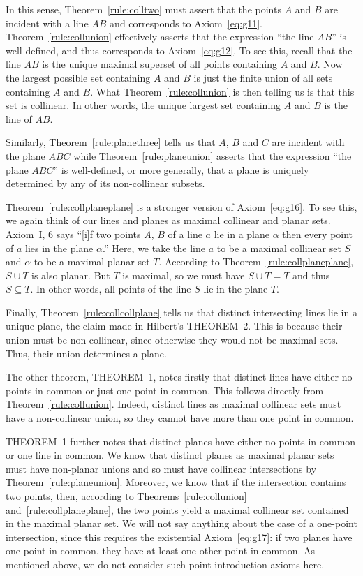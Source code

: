 In this sense, Theorem~\ref{rule:colltwo} must assert that the points $A$ and $B$ are incident with a line $AB$ and corresponds to Axiom~\ref{eq:g11}.  Theorem~\ref{rule:collunion} effectively asserts that the expression ``the line $AB$'' is well-defined, and thus corresponds to Axiom~\ref{eq:g12}. To see this, recall that the line $AB$ is the unique maximal superset of all points containing $A$ and $B$. Now the largest possible set containing $A$ and $B$ is just the finite union of all sets containing $A$ and $B$. What Theorem~\ref{rule:collunion} is then telling us is that this set is collinear. In other words, the unique largest set containing $A$ and $B$ is the line of $AB$.

Similarly, Theorem~\ref{rule:planethree} tells us that $A$, $B$ and $C$ are incident with the plane $ABC$ while Theorem~\ref{rule:planeunion} asserts that the expression ``the plane $ABC$'' is well-defined, or more generally, that a plane is uniquely determined by any of its non-collinear subsets.

Theorem~\ref{rule:collplaneplane} is a stronger version of Axiom~\ref{eq:g16}. To see this, we again think of our lines and planes as maximal collinear and planar sets. Axiom~I, 6 says ``[i]f two points $A$, $B$ of a line $a$ lie in a plane $\alpha$ then every point of $a$ lies in the plane $\alpha$.'' Here, we take the line $a$ to be a maximal collinear set $S$ and $\alpha$ to be a maximal planar set $T$. According to Theorem~\ref{rule:collplaneplane}, $S \cup T$ is also planar. But $T$ is maximal, so we must have $S \cup T = T$ and thus $S \subseteq T$. In other words, all points of the line $S$ lie in the plane $T$.

Finally, Theorem~\ref{rule:collcollplane} tells us that distinct intersecting lines lie in a unique plane, the claim made in Hilbert's THEOREM~2. This is because their union must be non-collinear, since otherwise they would not be maximal sets. Thus, their union determines a plane. 

The other theorem, THEOREM~1, notes firstly that distinct lines have either no points in common or just one point in common. This follows directly from Theorem~\ref{rule:collunion}. Indeed, distinct lines as maximal collinear sets must have a non-collinear union, so they cannot have more than one point in common.

THEOREM~1 further notes that distinct planes have either no points in common or one line in common. We know that distinct planes as maximal planar sets must have non-planar unions and so must have collinear intersections by Theorem~\ref{rule:planeunion}. Moreover, we know that if the intersection contains two points, then, according to Theorems~\ref{rule:collunion} and~\ref{rule:collplaneplane}, the two points yield a maximal collinear set contained in the maximal planar set. We will not say anything about the case of a one-point intersection, since this requires the existential Axiom~\ref{eq:g17}: if two planes have one point in common, they have at least one other point in common. As mentioned above, we do not consider such point introduction axioms here.

